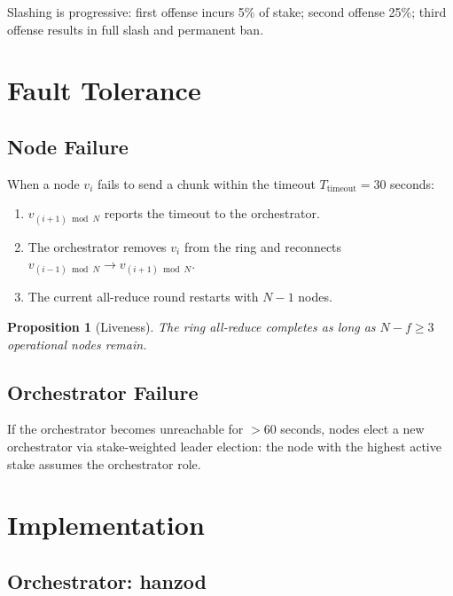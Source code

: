\documentclass[11pt,letterpaper]{article}
\newtheorem{proposition}[theorem]{Proposition}
\begin{document}
Slashing is progressive: first offense incurs 5\% of stake; second offense 25\%; third offense results in full slash and permanent ban.

\section{Fault Tolerance}
\label{sec:fault-tolerance}

\subsection{Node Failure}

When a node $v_i$ fails to send a chunk within the timeout $T_{\text{timeout}} = 30$ seconds:

\begin{enumerate}
    \item $v_{(i+1) \bmod N}$ reports the timeout to the orchestrator.
    \item The orchestrator removes $v_i$ from the ring and reconnects $v_{(i-1) \bmod N} \to v_{(i+1) \bmod N}$.
    \item The current all-reduce round restarts with $N-1$ nodes.
\end{enumerate}

\begin{proposition}[Liveness]
The ring all-reduce completes as long as $N - f \geq 3$ operational nodes remain.
\end{proposition}

\subsection{Orchestrator Failure}

If the orchestrator becomes unreachable for $>60$ seconds, nodes elect a new orchestrator via stake-weighted leader election: the node with the highest active stake assumes the orchestrator role.

\section{Implementation}
\label{sec:implementation}

\subsection{Orchestrator: hanzod}
\end{document}
